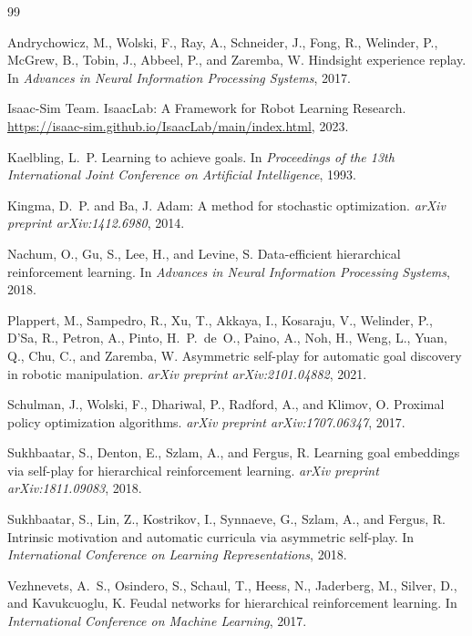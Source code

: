 \documentclass[12pt, a4paper]{article}
\begin{document}

\begin{thebibliography}{99}

Andrychowicz, M., Wolski, F., Ray, A., Schneider, J., Fong, R., Welinder, P.,
McGrew, B., Tobin, J., Abbeel, P., and Zaremba, W.
\newblock Hindsight experience replay.
\newblock In \emph{Advances in Neural Information Processing Systems}, 2017.

Isaac-Sim Team.
\newblock IsaacLab: A Framework for Robot Learning Research.
\newblock \url{https://isaac-sim.github.io/IsaacLab/main/index.html}, 2023.

Kaelbling, L.~P.
\newblock Learning to achieve goals.
\newblock In \emph{Proceedings of the 13th International Joint Conference on
  Artificial Intelligence}, 1993.

Kingma, D.~P. and Ba, J.
\newblock Adam: A method for stochastic optimization.
\newblock \emph{arXiv preprint arXiv:1412.6980}, 2014.

Nachum, O., Gu, S., Lee, H., and Levine, S.
\newblock Data-efficient hierarchical reinforcement learning.
\newblock In \emph{Advances in Neural Information Processing Systems}, 2018.

Plappert, M., Sampedro, R., Xu, T., Akkaya, I., Kosaraju, V., Welinder, P.,
D'Sa, R., Petron, A., Pinto, H.~P.~de~O., Paino, A., Noh, H., Weng, L., Yuan, Q.,
Chu, C., and Zaremba, W.
\newblock Asymmetric self-play for automatic goal discovery in robotic manipulation.
\newblock \emph{arXiv preprint arXiv:2101.04882}, 2021.

Schulman, J., Wolski, F., Dhariwal, P., Radford, A., and Klimov, O.
\newblock Proximal policy optimization algorithms.
\newblock \emph{arXiv preprint arXiv:1707.06347}, 2017.

Sukhbaatar, S., Denton, E., Szlam, A., and Fergus, R.
\newblock Learning goal embeddings via self-play for hierarchical reinforcement
  learning.
\newblock \emph{arXiv preprint arXiv:1811.09083}, 2018.

Sukhbaatar, S., Lin, Z., Kostrikov, I., Synnaeve, G., Szlam, A., and Fergus, R.
\newblock Intrinsic motivation and automatic curricula via asymmetric self-play.
\newblock In \emph{International Conference on Learning Representations}, 2018.

Vezhnevets, A.~S., Osindero, S., Schaul, T., Heess, N., Jaderberg, M.,
Silver, D., and Kavukcuoglu, K.
\newblock Feudal networks for hierarchical reinforcement learning.
\newblock In \emph{International Conference on Machine Learning}, 2017.

\end{thebibliography}
\end{document}
